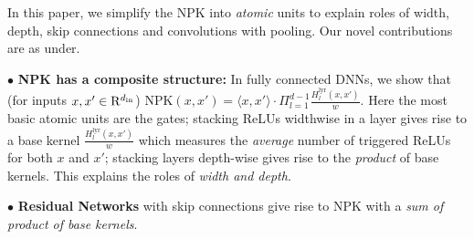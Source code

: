  In this paper, we simplify the NPK into \emph{atomic} units to explain roles of width, depth, skip connections and convolutions with pooling. Our novel contributions are as under.

$\bullet$ \textbf{NPK has a composite structure:} In fully connected DNNs, we show that (for inputs $x,x'\in\mathrm{R}^{d_{\text{in}}}$) NPK$(x,x')=\langle x,x'\rangle\cdot \Pi_{l=1}^{d-1} \frac{H^{\text{lyr}}_l(x,x')}{w}$. Here the most basic atomic units are the gates; stacking ReLUs widthwise in a layer gives rise to a base kernel $\frac{H^{\text{lyr}}_l(x,x')}{w}$ which measures the \emph{average} number of triggered ReLUs for both $x$ and $x'$; stacking layers depth-wise gives rise to the \emph{product} of base kernels. This explains the roles of \emph{width and depth}.

$\bullet$ \textbf{Residual Networks} with skip connections give rise to NPK with a \emph{ sum of product of base kernels}.

